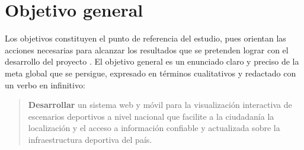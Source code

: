 
\section{Objetivo general}

Los objetivos constituyen el punto de referencia del estudio, pues orientan
las acciones necesarias para alcanzar los resultados que se pretenden lograr
con el desarrollo del proyecto \citep{arias2012}. El objetivo general es un
enunciado claro y preciso de la meta global que se persigue, expresado en
t\'erminos cualitativos y redactado con un verbo en infinitivo:

\begin{quote}
\textbf{Desarrollar} un sistema web y m\'ovil para la visualizaci\'on interactiva
de escenarios deportivos a nivel nacional que facilite a la ciudadan\'ia la
localizaci\'on y el acceso a informaci\'on confiable y actualizada sobre la
infraestructura deportiva del pa\'is.
\end{quote}
